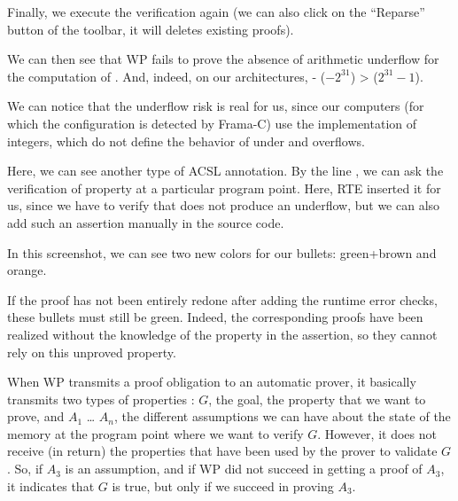 

Finally, we execute the verification again (we can also click on the
``Reparse'' button of the toolbar, it will deletes existing proofs).

We can then see that WP fails to prove the absence of arithmetic
underflow for the computation of . And, indeed, on our
architectures, - ($-2^{31}$) >  ($2^{31}-1$).





\begin{Information}
We can notice that the underflow risk
is real for us, since our computers (for which the
configuration is detected by Frama-C) use the 
implementation of integers, which do not define
the behavior of under and overflows.
\end{Information}


Here, we can see another type of ACSL annotation. By the line
, we can ask the verification of
property at a particular program point. Here, RTE inserted it for us, since
we have to verify that  does not produce an underflow, but
we can also add such an assertion manually in the source code.



In this screenshot, we can see two new colors for our bullets:
green+brown and orange.



If the proof has not been entirely redone after adding the runtime error
checks, these bullets must still be green. Indeed, the corresponding
proofs have been realized without the knowledge of the property in the
assertion, so they cannot rely on this unproved property.



When WP transmits a proof obligation to an automatic prover, it
basically transmits two types of properties : $G$, the goal, the
property that we want to prove, and $A_1$ \ldots{} $A_n$, the
different assumptions we can have about the state of the memory at the
program point where we want to verify $G$. However, it does not
receive (in return) the properties that have been used by the prover to
validate $G$. So, if $A_3$ is an assumption, and if WP did not
succeed in getting a proof of $A_3$, it indicates that $G$ is true,
but only if we succeed in proving $A_3$.




